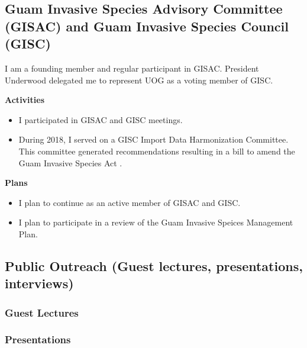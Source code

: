 \documentclass[12pt,english]{scrartcl}
\newcommand{\activities}{\medskip\textbf{Activities}}
\newcommand{\plans}{\medskip\textbf{Plans}}
\begin{document}
\subsection{Guam Invasive Species Advisory Committee (GISAC) and Guam Invasive Species Council (GISC)}
\begin{refsection}
	
I am a founding member and regular participant in GISAC. President Underwood delegated me to represent UOG as a voting member of GISC.

\activities

\begin{itemize}
	
\item I participated in GISAC and GISC meetings.

\item During 2018, I served on a GISC Import Data Harmonization Committee.
This committee generated recommendations \cite{guerrero_guam_2018}
resulting in a bill to amend the Guam Invasive Species Act \cite{guerrero_bill_2018}.

\end{itemize}

\plans

\begin{itemize}
	
\item I plan to continue as an active member of GISAC and GISC.

\item I plan to participate in a review of the Guam Invasive Speices Management Plan.

\end{itemize}

\printbibliography

\end{refsection}

\subsection{Public Outreach (Guest lectures, presentations, interviews)}
	
\subsubsection{Guest Lectures}

\subsubsection{Presentations}
\begin{refsection}
	
\nocite{*}
\printbibliography[filter=presentations]
\end{refsection} 
\end{document}
